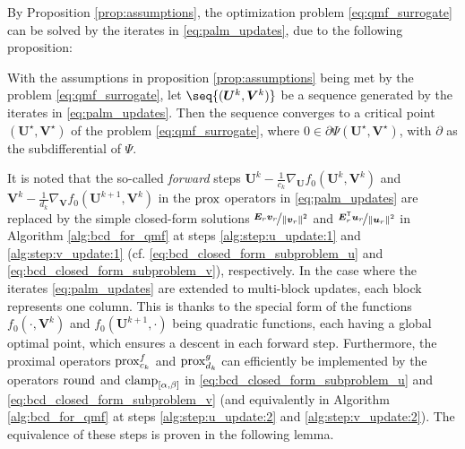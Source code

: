 By Proposition \ref{prop:assumptions}, the optimization problem \eqref{eq:qmf_surrogate} can be solved by the iterates in \eqref{eq:palm_updates}, due to the following proposition:
\begin{prop}\label{prop:convergence}
    With the assumptions in proposition \ref{prop:assumptions} being met by the problem \eqref{eq:qmf_surrogate}, let $\seq{(\bm U^k, \bm V^k)}$ be a sequence generated by the iterates in \eqref{eq:palm_updates}. Then the sequence converges to a critical point $(\bm U^\star, \bm V^\star)$ of the problem \eqref{eq:qmf_surrogate}, where $0 \in \partial \Psi(\bm U^\star, \bm V^\star)$, with $\partial$ as the subdifferential of $\Psi$.
\end{prop}

It is noted that the so-called \emph{forward} steps $\bm U^k - \frac{1}{c_k} \nabla_{\bm U} f_0(\bm U^k, \bm V^k)$ and $\bm V^k - \frac{1}{d_k} \nabla_{\bm V} f_0(\bm U^{k+1}, \bm V^k)$ in the $\operatorname{prox}$ operators in \eqref{eq:palm_updates} are replaced by the simple closed-form solutions $\nicefrac{\bm{E}_r \bm{v}_r}{\lVert \bm{v}_r \rVert^2}$ and $\nicefrac{\bm{E}_r^\mathsf{T} \bm{u}_r}{\lVert \bm{u}_r \rVert^2}$ in Algorithm \ref{alg:bcd_for_qmf} at steps \ref{alg:step:u_update:1} and \ref{alg:step:v_update:1} (cf. \eqref{eq:bcd_closed_form_subproblem_u} and \eqref{eq:bcd_closed_form_subproblem_v}), respectively. In the case where the iterates \eqref{eq:palm_updates} are extended to multi-block updates, each block represents one column. This is thanks to the special form of the functions $f_0(\cdot, \bm V^k)$ and $f_0(\bm U^{k+1}, \cdot)$ being quadratic functions, each having a global optimal point, which ensures a descent in each forward step.
Furthermore, the proximal operators $\operatorname{prox}^f_{c_k}$ and $\operatorname{prox}^g_{d_k}$ can efficiently be implemented by the operators $\operatorname{round}$ and $\operatorname{clamp}_{[\alpha,\beta]}$ in \eqref{eq:bcd_closed_form_subproblem_u} and \eqref{eq:bcd_closed_form_subproblem_v} (and equivalently in Algorithm \ref{alg:bcd_for_qmf} at steps \ref{alg:step:u_update:2} and \ref{alg:step:v_update:2}). The equivalence of these steps is proven in the following lemma.

